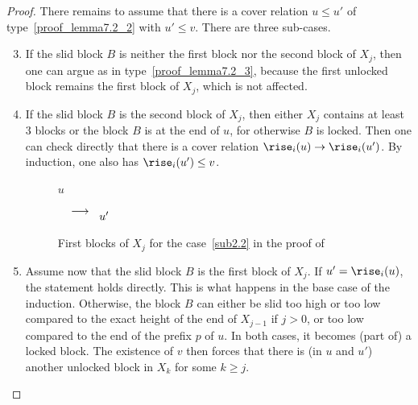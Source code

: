 \begin{proof}
  There remains to assume that there is a cover relation $u \leq u'$
  of type~\eqref{proof_lemma7.2_2} with $u' \leq v$. There are three sub-cases.

  \begin{enumerate}
%
\setcounter{enumi}{2}
\item\label{sub2.3} 
  If the slid block $B$ is neither the
  first block nor the second block of $X_j$, then one can argue as in
  type~\eqref{proof_lemma7.2_3}, because the first unlocked block remains the
  first block of $X_j$, which is not affected.

\setcounter{enumi}{1}
\item\label{sub2.2} 
%
If the slid block $B$ is the second block of $X_j$, then either
  $X_j$ contains at least~$3$ blocks or the block $B$ is at the end of
  $u$, for otherwise $B$ is locked.  Then one can
  check directly that there is a cover relation
  $\rise_i(u) \to \rise_i(u')$. By induction, one also has $\rise_i(u') \leq v$.

  \begin{figure}[htb]
    \centering
    $u$$\quad\phantom{\longrightarrow}\put(-15,5){$\longrightarrow$} \quad u'$
    \caption{First blocks of $X_j$ for the case~\ref{sub2.2} in the proof of }
    \label{cas2.2}
  \end{figure}

\setcounter{enumi}{0}
\item\label{sub2.1} 
%
Assume now that the slid block $B$ is the first block of
  $X_j$. If $u' = \rise_i(u)$, the statement holds directly. This is
  what happens in the base case of the induction. Otherwise, the block
  $B$ can either be slid too high or too low compared to the exact
  height of the end of $X_{j-1}$ if $j > 0$, or too low compared to the end of the
  prefix $p$ of $u$. In both cases, it becomes (part of) a locked
  block. The existence of $v$ then forces that there is (in $u$ and $u'$) another
  unlocked block in $X_k$ for some $k \geq j$.


\end{enumerate}
\end{proof}
